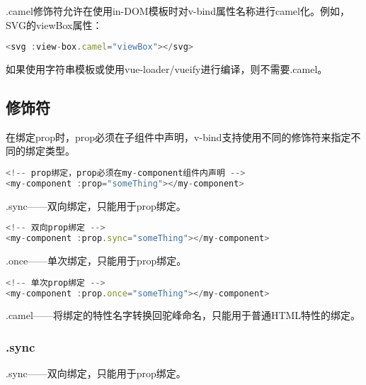 \begin{compactitem}
\item .camel修饰符允许在使用in-DOM模板时对v-bind属性名称进行camel化。例如，SVG的viewBox属性：

\begin{lstlisting}[language=JavaScript]
<svg :view-box.camel="viewBox"></svg>
\end{lstlisting}


\item 如果使用字符串模板或使用vue-loader/vueify进行编译，则不需要.camel。
\end{compactitem}


\subsection{修饰符}

在绑定prop时，prop必须在子组件中声明，v-bind支持使用不同的修饰符来指定不同的绑定类型。


\begin{lstlisting}[language=JavaScript]
<!-- prop绑定，prop必须在my-component组件内声明 -->
<my-component :prop="someThing"></my-component>
\end{lstlisting}


\begin{compactitem}
\item .sync——双向绑定，只能用于prop绑定。

\begin{lstlisting}[language=JavaScript]
<!-- 双向prop绑定 -->
<my-component :prop.sync="someThing"></my-component>
\end{lstlisting}


\item .once——单次绑定，只能用于prop绑定。

\begin{lstlisting}[language=JavaScript]
<!-- 单次prop绑定 -->
<my-component :prop.once="someThing"></my-component>
\end{lstlisting}


\item .camel——将绑定的特性名字转换回驼峰命名，只能用于普通HTML特性的绑定。
\end{compactitem}

\subsubsection{.sync}

.sync——双向绑定，只能用于prop绑定。



